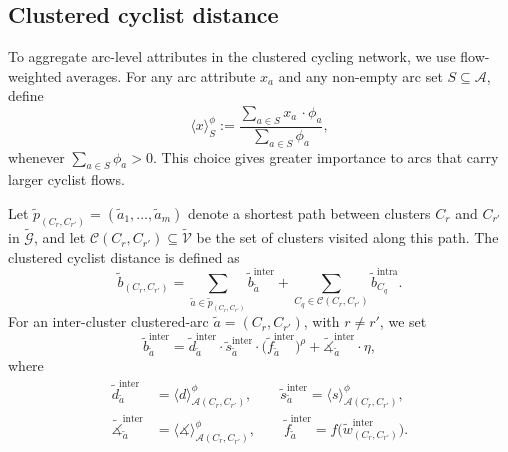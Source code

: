 \documentclass[lettersize,journal]{IEEEtran}
\begin{document}
\subsection{Clustered cyclist distance}


To aggregate arc-level attributes in the clustered cycling network, we use flow-weighted averages. For any arc
attribute $x_a$ and any non-empty arc set $S\subseteq\mathcal{A}$, define
\begin{equation}
  \langle x\rangle_S^\phi
  :=
  \frac{\sum_{a\in S} x_a\, \cdot \phi_a}
       {\sum_{a\in S} \phi_a},
\end{equation}
whenever $\sum_{a\in S}\phi_a>0$. This choice gives greater importance to arcs
that carry larger cyclist flows.

Let $\tilde{p}_{(C_r,C_{r'})}=(\tilde{a}_1,\dots,\tilde{a}_m)$ denote a shortest
path between clusters $C_r$ and $C_{r'}$ in $\tilde{\mathcal{G}}$, and let
$\mathcal{C}(C_r,C_{r'})\subseteq\tilde{\mathcal{V}}$ be the set of clusters
visited along this path. The clustered cyclist distance is defined as
\begin{equation}
\label{eq:clustered_cyclist_distance}
  \tilde{b}_{(C_r,C_{r'})}
  =
  \sum_{\tilde{a}\in\tilde{p}_{(C_r,C_{r'})}}
  \tilde{b}^{\mathrm{inter}}_{\tilde{a}}
  +
  \sum_{C_q\in\mathcal{C}(C_r,C_{r'})}
  \tilde{b}^{\mathrm{intra}}_{C_q}.
\end{equation}
For an inter-cluster clustered-arc $\tilde{a}=(C_r,C_{r'})$, with $r\neq r'$, we set
\begin{equation}
  \tilde{b}^{\mathrm{inter}}_{\tilde{a}}
  =
  \tilde{d}^{\mathrm{inter}}_{\tilde{a}} \cdot
  \tilde{s}^{\mathrm{inter}}_{\tilde{a}} \cdot
  \bigl(\tilde{f}^{\mathrm{inter}}_{\tilde{a}}\bigr)^\rho
  +
  \tilde{\measuredangle}^{\mathrm{inter}}_{\tilde{a}} \cdot \eta,
\end{equation}
where
\begin{equation}
\begin{aligned}
  \tilde{d}^{\mathrm{inter}}_{\tilde{a}}
  &= \langle d\rangle_{\mathcal{A}(C_r,C_{r'})}^{\phi}, \qquad
  \tilde{s}^{\mathrm{inter}}_{\tilde{a}}
  = \langle s\rangle_{\mathcal{A}(C_r,C_{r'})}^{\phi}, \\
  \tilde{\measuredangle}^{\mathrm{inter}}_{\tilde{a}}
  &= \langle \measuredangle\rangle_{\mathcal{A}(C_r,C_{r'})}^{\phi}, \qquad
  \tilde{f}^{\mathrm{inter}}_{\tilde{a}}
  = f\bigl(\tilde{w}^{\mathrm{inter}}_{(C_r,C_{r'})}\bigr).
\end{aligned}
\end{equation}
\end{document}
